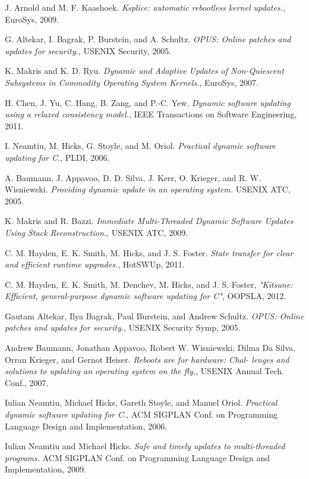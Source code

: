 \documentclass[a4paper,11pt,twoside]{report}
\begin{document}
\begin{thebibliography}{1}
   J. Arnold and M. F. Kaashoek. {\em Ksplice: automatic rebootless kernel updates.}, EuroSys, 2009.
  
    G. Altekar, I. Bagrak, P. Burstein, and A. Schultz. {\em OPUS: Online patches and updates for security.}, USENIX Security, 2005.


   K. Makris and K. D. Ryu. {\em Dynamic and Adaptive Updates of Non-Quiescent Subsystems in Commodity Operating System Kernels.}, EuroSys, 2007. 
  
   H. Chen, J. Yu, C. Hang, B. Zang, and P.-C. Yew. {\em Dynamic software updating using a relaxed consistency model.}, IEEE Transactions on Software Engineering, 2011.

   I. Neamtiu, M. Hicks, G. Stoyle, and M. Oriol. {\em Practical dynamic software updating for C.}, PLDI, 2006.
  
   A. Baumann, J. Appavoo, D. D. Silva, J. Kerr, O. Krieger, and R. W. Wisniewski. {\em Providing dynamic update in an operating system.} USENIX ATC, 2005. 

   K. Makris and R. Bazzi. {\em Immediate Multi-Threaded Dynamic Software Updates Using Stack Reconstruction.}, USENIX ATC, 2009.

  C. M. Hayden, E. K. Smith, M. Hicks, and J. S. Foster. {\em State transfer for clear and efficient runtime upgrades.}, HotSWUp, 2011.
 
   C. M. Hayden, E. K. Smith, M. Denchev, M. Hicks, and J. S. Foster, {\em "Kitsune: Efficient, general-purpose dynamic software updating for C"}, OOPSLA, 2012.
  
   Gautam Altekar, Ilya Bagrak, Paul Burstein, and Andrew Schultz. {\em OPUS: Online patches and updates for security.}, USENIX Security Symp, 2005. 

   Andrew Baumann, Jonathan Appavoo, Robert W. Wisniewski, Dilma Da Silva, Orran Krieger, and Gernot Heiser. {\em Reboots are for hardware: Chal- lenges and solutions to updating an operating system on the fly.}, USENIX Annual Tech. Conf., 2007. 
  
   Iulian Neamtiu, Michael Hicks, Gareth Stoyle, and Manuel Oriol. {\em Practical dynamic software updating for C.}, ACM SIGPLAN Conf. on Programming Language Design and Implementation, 2006.

   Iulian Neamtiu and Michael Hicks. {\em Safe and timely updates to multi-threaded programs.} ACM SIGPLAN Conf. on Programming Language Design and Implementation,  2009.


\end{thebibliography}
\end{document}
